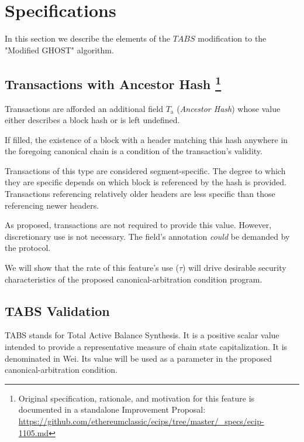 \documentclass[11pt]{article}
\theoremstyle{plain}
\begin{document}

\pagebreak
\section{\normalsize{Specifications}}

In this section we describe the elements of the $TABS$ modification to the
"Modified GHOST" algorithm.

\subsection{\small{Transactions with Ancestor Hash\nolinebreak
\footnote{Original specification, rationale, and motivation for this feature is
documented in a standalone Improvement Proposal: \url{https://github.com/ethereumclassic/ecips/tree/master/_specs/ecip-1105.md}}}}

Transactions are afforded an additional field $T_\mathrm{a}$ (\textit{Ancestor
Hash}) whose value either describes a block hash or is left undefined.

If filled, the existence of a block with a header matching this hash anywhere
in the foregoing canonical chain is a condition of the transaction's validity.

Transactions of this type are considered segment-specific.
The degree to which they are specific depends on which block is referenced by the hash is provided.
Transactions referencing relatively older headers are less specific than those referencing newer headers.

As proposed, transactions are not required to provide this value.
However, discretionary use is not necessary.
The field's annotation \textit{could} be demanded by the protocol.

We will show that the rate of this feature's use ($\tau$) will drive desirable
security characteristics of the proposed canonical-arbitration condition program.


\subsection{\small{TABS Validation}}

TABS stands for Total Active Balance Synthesis.
It is a positive scalar value intended to provide a representative measure of 
chain state capitalization.
It is denominated in Wei.
Its value will be used as a parameter in the proposed canonical-arbitration
condition.
\end{document}
